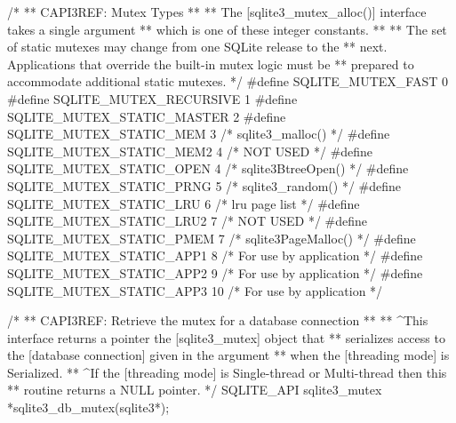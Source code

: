 \begin{Codex}[label=sqlite3.h,numbers=left]
{/*
** CAPI3REF: Mutex Types
**
** The [sqlite3_mutex_alloc()] interface takes a single argument
** which is one of these integer constants.
**
** The set of static mutexes may change from one SQLite release to the
** next.  Applications that override the built-in mutex logic must be
** prepared to accommodate additional static mutexes.
*/
#define SQLITE_MUTEX_FAST             0
#define SQLITE_MUTEX_RECURSIVE        1
#define SQLITE_MUTEX_STATIC_MASTER    2
#define SQLITE_MUTEX_STATIC_MEM       3  /* sqlite3_malloc() */
#define SQLITE_MUTEX_STATIC_MEM2      4  /* NOT USED */
#define SQLITE_MUTEX_STATIC_OPEN      4  /* sqlite3BtreeOpen() */
#define SQLITE_MUTEX_STATIC_PRNG      5  /* sqlite3_random() */
#define SQLITE_MUTEX_STATIC_LRU       6  /* lru page list */
#define SQLITE_MUTEX_STATIC_LRU2      7  /* NOT USED */
#define SQLITE_MUTEX_STATIC_PMEM      7  /* sqlite3PageMalloc() */
#define SQLITE_MUTEX_STATIC_APP1      8  /* For use by application */
#define SQLITE_MUTEX_STATIC_APP2      9  /* For use by application */
#define SQLITE_MUTEX_STATIC_APP3     10  /* For use by application */

/*
** CAPI3REF: Retrieve the mutex for a database connection
**
** ^This interface returns a pointer the [sqlite3_mutex] object that 
** serializes access to the [database connection] given in the argument
** when the [threading mode] is Serialized.
** ^If the [threading mode] is Single-thread or Multi-thread then this
** routine returns a NULL pointer.
*/
SQLITE_API sqlite3_mutex *sqlite3_db_mutex(sqlite3*);

}
\end{Codex}
